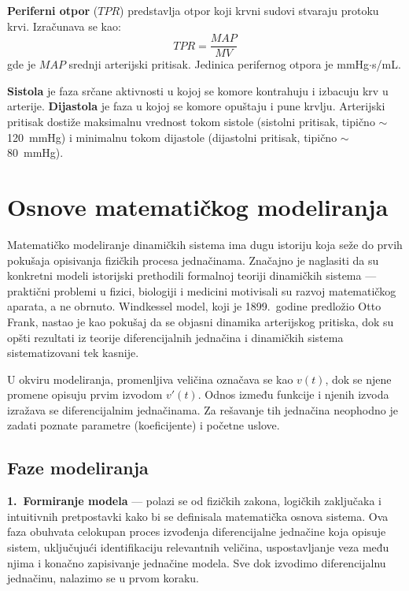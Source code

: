 \documentclass[12pt,a4paper]{article}
\begin{document}
\textbf{Periferni otpor} ($TPR$) predstavlja otpor koji krvni sudovi stvaraju protoku krvi. Izračunava se kao:
\begin{equation}
    TPR = \frac{MAP}{MV}
\end{equation}
gde je $MAP$ srednji arterijski pritisak. Jedinica perifernog otpora je mmHg$\cdot$s/mL.

\textbf{Sistola} je faza srčane aktivnosti u kojoj se komore kontrahuju i izbacuju krv u arterije. \textbf{Dijastola} je faza u kojoj se komore opuštaju i pune krvlju. Arterijski pritisak dostiže maksimalnu vrednost tokom sistole (sistolni pritisak, tipično $\sim$120~mmHg) i minimalnu tokom dijastole (dijastolni pritisak, tipično $\sim$80~mmHg).


\section{Osnove matematičkog modeliranja}

Matematičko modeliranje dinamičkih sistema ima dugu istoriju koja seže do prvih pokušaja opisivanja fizičkih procesa jednačinama. Značajno je naglasiti da su konkretni modeli istorijski prethodili formalnoj teoriji dinamičkih sistema --- praktični problemi u fizici, biologiji i medicini motivisali su razvoj matematičkog aparata, a ne obrnuto. Windkessel model, koji je 1899.\ godine predložio Otto Frank, nastao je kao pokušaj da se objasni dinamika arterijskog pritiska, dok su opšti rezultati iz teorije diferencijalnih jednačina i dinamičkih sistema sistematizovani tek kasnije.

U okviru modeliranja, promenljiva veličina označava se kao $v(t)$, dok se njene promene opisuju prvim izvodom $v'(t)$. Odnos između funkcije i njenih izvoda izražava se diferencijalnim jednačinama. Za rešavanje tih jednačina neophodno je zadati poznate parametre (koeficijente) i početne uslove.

\subsection{Faze modeliranja}

\textbf{1.\ Formiranje modela} --- polazi se od fizičkih zakona, logičkih zaključaka i intuitivnih pretpostavki kako bi se definisala matematička osnova sistema. Ova faza obuhvata celokupan proces izvođenja diferencijalne jednačine koja opisuje sistem, uključujući identifikaciju relevantnih veličina, uspostavljanje veza među njima i konačno zapisivanje jednačine modela. Sve dok izvodimo diferencijalnu jednačinu, nalazimo se u prvom koraku.
\end{document}

